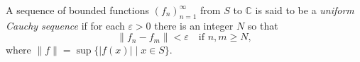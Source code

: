 A sequence of bounded functions $(f_n)_{n=1}^{\infty}$ from $S$ to $\mathbb{C}$ is said to be a \emph{uniform Cauchy sequence} if for each $\varepsilon > 0$ there is an integer $N$ so that
$$
\|f_n - f_m\| < \varepsilon \quad \text{if } n, m \geq N,
$$
where $\|f\| = \sup \{|f(x)| \mid x \in S\}$.
